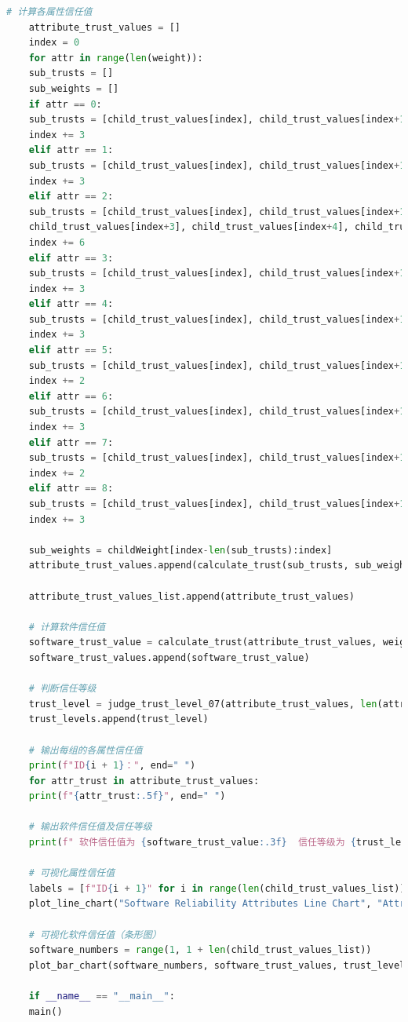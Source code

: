 \documentclass{article}
\begin{document}
\begin{lstlisting}[language=Python]
	# 计算各属性信任值
	attribute_trust_values = []
	index = 0
	for attr in range(len(weight)):
	sub_trusts = []
	sub_weights = []
	if attr == 0:
	sub_trusts = [child_trust_values[index], child_trust_values[index+1], child_trust_values[index+2]]
	index += 3
	elif attr == 1:
	sub_trusts = [child_trust_values[index], child_trust_values[index+1], child_trust_values[index+2]]
	index += 3
	elif attr == 2:
	sub_trusts = [child_trust_values[index], child_trust_values[index+1], child_trust_values[index+2],
	child_trust_values[index+3], child_trust_values[index+4], child_trust_values[index+5]]
	index += 6
	elif attr == 3:
	sub_trusts = [child_trust_values[index], child_trust_values[index+1], child_trust_values[index+2]]
	index += 3
	elif attr == 4:
	sub_trusts = [child_trust_values[index], child_trust_values[index+1], child_trust_values[index+2]]
	index += 3
	elif attr == 5:
	sub_trusts = [child_trust_values[index], child_trust_values[index+1]]
	index += 2
	elif attr == 6:
	sub_trusts = [child_trust_values[index], child_trust_values[index+1], child_trust_values[index+2]]
	index += 3
	elif attr == 7:
	sub_trusts = [child_trust_values[index], child_trust_values[index+1]]
	index += 2
	elif attr == 8:
	sub_trusts = [child_trust_values[index], child_trust_values[index+1], child_trust_values[index+2]]
	index += 3
	
	sub_weights = childWeight[index-len(sub_trusts):index]
	attribute_trust_values.append(calculate_trust(sub_trusts, sub_weights))
	
	attribute_trust_values_list.append(attribute_trust_values)
	
	# 计算软件信任值
	software_trust_value = calculate_trust(attribute_trust_values, weight)
	software_trust_values.append(software_trust_value)
	
	# 判断信任等级
	trust_level = judge_trust_level_07(attribute_trust_values, len(attribute_trust_values), software_trust_value)
	trust_levels.append(trust_level)
	
	# 输出每组的各属性信任值
	print(f"ID{i + 1}：", end=" ")
	for attr_trust in attribute_trust_values:
	print(f"{attr_trust:.5f}", end=" ")
	
	# 输出软件信任值及信任等级
	print(f" 软件信任值为 {software_trust_value:.3f}  信任等级为 {trust_level}")
	
	# 可视化属性信任值
	labels = [f"ID{i + 1}" for i in range(len(child_trust_values_list))]
	plot_line_chart("Software Reliability Attributes Line Chart", "Attributes", "Trust Value", attribute_trust_values_list, labels)
	
	# 可视化软件信任值（条形图）
	software_numbers = range(1, 1 + len(child_trust_values_list))
	plot_bar_chart(software_numbers, software_trust_values, trust_levels)
	
	if __name__ == "__main__":
	main()
	
\end{lstlisting}
\end{document}
